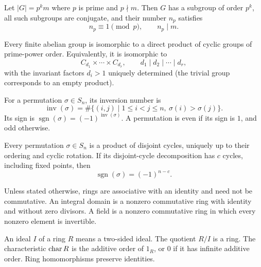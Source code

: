 \begin{theorem}
Let $|G|=p^km$ where $p$ is prime and $p\nmid m$. Then $G$ has a subgroup of order $p^k$, all such subgroups are conjugate, and their number $n_p$ satisfies
\[
 n_p\equiv1\pmod p, \qquad n_p\mid m.
\]
\end{theorem}

\begin{theorem}
Every finite abelian group is isomorphic to a direct product of cyclic groups of prime-power order. Equivalently, it is isomorphic to
\[
 C_{d_1}\times\cdots\times C_{d_r},
 \qquad d_1\mid d_2\mid\cdots\mid d_r,
\]
with the invariant factors $d_i>1$ uniquely determined (the trivial group corresponds to an empty product).
\end{theorem}


\begin{definition}
For a permutation $\sigma\in S_n$, its inversion number is
\[
 \operatorname{inv}(\sigma)=\#\{(i,j)\mid 1\le i<j\le n,\ \sigma(i)>\sigma(j)\}.
\]
Its sign is $\operatorname{sgn}(\sigma)=(-1)^{\operatorname{inv}(\sigma)}$. A permutation is even if its sign is $1$, and odd otherwise.
\end{definition}

\begin{theorem}
Every permutation $\sigma\in S_n$ is a product of disjoint cycles, uniquely up to their ordering and cyclic rotation. If its disjoint-cycle decomposition has $c$ cycles, including fixed points, then
\[
 \operatorname{sgn}(\sigma)=(-1)^{n-c}.
\]
\end{theorem}

\begin{definition}
Unless stated otherwise, rings are associative with an identity and need not be commutative. An integral domain is a nonzero commutative ring with identity and without zero divisors. A field is a nonzero commutative ring in which every nonzero element is invertible.
\end{definition}

\begin{definition}
An ideal $I$ of a ring $R$ means a two-sided ideal. The quotient $R/I$ is a ring. The characteristic $\operatorname{char} R$ is the additive order of $1_R$, or $0$ if it has infinite additive order. Ring homomorphisms preserve identities.
\end{definition}

